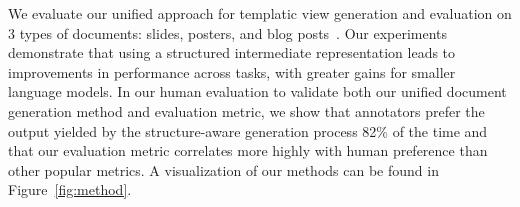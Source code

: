 We evaluate our unified approach for templatic view generation and evaluation on 3 types of documents: slides, posters, and blog posts~\cite{Fu2021DOC2PPTAP,Qiang2016LearningTG,chandrasekaran2020overview}. %
Our experiments demonstrate that using a structured intermediate representation leads to improvements in performance across tasks, with greater gains for smaller language models.
In our human evaluation to validate both our unified document generation method and evaluation metric, we show that annotators prefer the output yielded by the structure-aware generation process 82\% of the time and that our evaluation metric correlates more highly with human preference than other popular metrics. A visualization of our methods can be found in Figure~\ref{fig:method}. 
